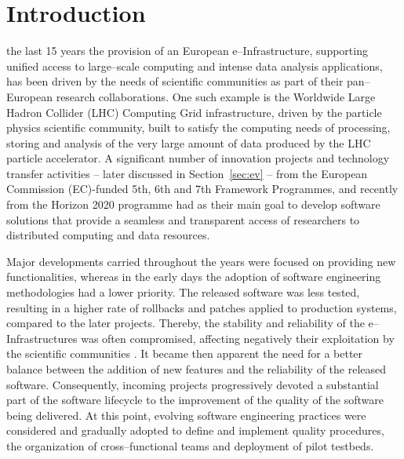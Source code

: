 \documentclass[journal]{IEEEtran}
\begin{document}
\section{Introduction}

 the last 15 years the provision of an European e--Infrastructure,
supporting unified access to large--scale computing and intense data analysis
applications, has been driven by the needs of scientific communities as part of their
pan--European research collaborations. One such example is the Worldwide
Large Hadron Collider (LHC) Computing Grid infrastructure, driven
by the particle physics scientific community, built to satisfy the computing needs
of processing, storing and analysis of the very large amount of data produced by the
LHC particle accelerator. A significant number of innovation projects and technology transfer
activities -- later discussed in Section~\ref{sec:ev} -- from the European Commission
(EC)-funded 5th, 6th and 7th Framework Programmes, and recently from the Horizon 2020 programme
\cite{h2020} had as their main goal to develop software solutions that provide a seamless and
transparent access of researchers to distributed computing and data resources.

Major developments carried throughout the years were focused on providing new
functionalities, whereas in the early days the adoption of software engineering methodologies had a lower priority.
The released software was less tested, resulting in a higher rate of
rollbacks and patches applied to production systems, compared to the later projects. Thereby, the stability and
reliability of the e--Infrastructures was often compromised, affecting
negatively their exploitation by the scientific communities \cite{aiftimiei}.
It became then apparent the need for a better balance between the addition of new features
and the reliability of the released software. Consequently, incoming projects progressively
devoted a substantial part of the software lifecycle to the improvement of the quality of the
software being delivered. At this point, evolving software engineering practices were considered
and gradually adopted to define and implement quality procedures, the organization of
cross--functional teams and deployment of pilot testbeds.
\end{document}

